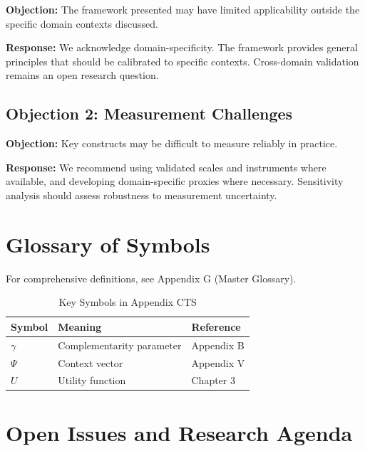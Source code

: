 \textbf{Objection:} The framework presented may have limited applicability
outside the specific domain contexts discussed.

\textbf{Response:} We acknowledge domain-specificity. The framework provides
general principles that should be calibrated to specific contexts. Cross-domain
validation remains an open research question.

\subsection{Objection 2: Measurement Challenges}

\textbf{Objection:} Key constructs may be difficult to measure reliably in
practice.

\textbf{Response:} We recommend using validated scales and instruments where
available, and developing domain-specific proxies where necessary. Sensitivity
analysis should assess robustness to measurement uncertainty.



\section{Glossary of Symbols}
\label{sec:cts-glossary}

For comprehensive definitions, see Appendix G (Master Glossary).

\begin{table}[htbp]
\centering
\caption{Key Symbols in Appendix CTS}
\begin{tabular}{lll}
\toprule
\textbf{Symbol} & \textbf{Meaning} & \textbf{Reference} \\
\midrule
$\gamma$ & Complementarity parameter & Appendix B \\
$\Psi$ & Context vector & Appendix V \\
$U$ & Utility function & Chapter 3 \\
\bottomrule
\end{tabular}
\end{table}



\section{Open Issues and Research Agenda}
\label{sec:cts-open}

